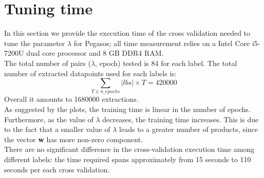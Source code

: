 \documentclass{article}
\begin{document}
\section{Tuning time} \label{tuning time section}
In this section we provide the execution time of the cross validation needed to tune the parameter $\lambda$ for Pegasos; all time measurement relies on a Intel Core i5-7200U dual core processor and 8 GB DDR4 RAM.\\
The total number of pairs ($\lambda$, epoch) tested is 84 for each label. The total number of extracted datapoints used for each labels is:
\begin{equation}
    \sum_{T \in n\_epochs} |lbs| \times T = 420000
\end{equation}
\noindent Overall it amounts to 1680000 extractions.\\ 
As suggested by the plots, the training time is linear in the number of epochs. Furthermore, as the value of $\lambda$ decreases, the training time increases. This is due to the fact that a smaller value of $\lambda$ leads to a greater number of products, since the vector \textbf{w} has more non-zero component. \\
There are no significant difference in the cross-validation execution time among different labels: the time required spans approximately from 15 seconds to 110 seconds per each cross validation.
\end{document}
